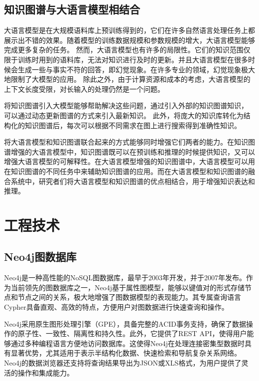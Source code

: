 \subsection{知识图谱与大语言模型相结合}

大语言模型是在大规模语料库上预训练得到的，它们在许多自然语言处理任务上都展示出不错的效果。随着模型的训练数据规模和参数规模的增大，大语言模型能够完成更多复杂的任务。
然而，大语言模型也有许多的局限性。它们的知识范围仅限于训练时用到的语料库\cite{AlKhamissi2022}，无法对知识进行及时的更新。并且大语言模型在很多时候会生成一些与事实不符的回答\cite{Ji2023}，即幻觉现象。在许多专业的领域，幻觉现象极大地限制了大模型的应用。
除此之外，由于计算资源和成本的考虑，大语言模型的上下文长度受限，对长输入的处理仍然是一个问题。

将知识图谱引入大模型能够帮助解决这些问题\cite{zou2020survey, Luo2023, KXTS202310006}，通过引入外部的知识图谱知识，
可以通过动态更新图谱的方式来引入最新知识。
此外，将庞大的知识库转化为结构化的知识图谱后，每次可以根据不同需求在图上进行搜索\cite{Ma2024, Ma2024}得到准确性知识。

将大语言模型和知识图谱联合起来的方式能够同时增强它们两者的能力。在知识图谱增强的大语言模型中，知识图谱既可以在预训练和推理的时候提供知识\cite{Zhang2019}，又可以增强大语言模型的可解释性\cite{Lin2019}。在大语言模型增强的知识图谱中，大语言模型可以用在知识图谱的不同任务中来辅助知识图谱的应用。而在大语言模型和知识图谱的融合系统中，研究者们将大语言模型和知识图谱的优点相结合，用于增强知识表达\cite{Yasunaga2022}和推理\cite{Choudhary2023}。

\section{工程技术}

\subsection{Neo4j图数据库}

Neo4j是一种高性能的NoSQL图数据库，最早于2003年开发，并于2007年发布。作为当前领先的图数据库之一，Neo4j基于属性图模型，能够以键值对的形式存储节点和节点之间的关系，极大地增强了图数据模型的表现能力。其专属查询语言Cypher具备直观、高效的特点，方便用户对图数据进行快速查询和操作。

Neo4j采用原生图形处理引擎（GPE），具备完整的ACID事务支持，确保了数据操作的原子性、一致性、隔离性和持久性。此外，它提供了REST API，使得用户能够通过多种编程语言方便地访问数据库。这使得Neo4j在处理连接密集型数据时具有显著优势，尤其适用于表示半结构化数据、快速检索和导航复杂关系网络。Neo4j的数据浏览器还支持将查询结果导出为JSON或XLS格式，为用户提供了灵活的操作和集成能力。 

